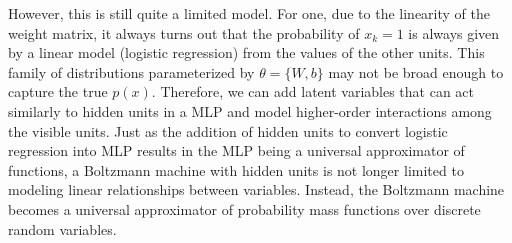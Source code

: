 \documentclass{article}
\begin{document}
  However, this is still quite a limited model. For one, due to the linearity of the weight matrix, it always turns out that the probability of $x_k = 1$ is always given by a linear model (logistic regression) from the values of the other units. This family of distributions parameterized by $\theta = \{W, b\}$ may not be broad enough to capture the true $p(x)$. Therefore, we can add latent variables that can act similarly to hidden units in a MLP and model higher-order interactions among the visible units. Just as the addition of hidden units to convert logistic regression into MLP results in the MLP being a universal approximator of functions, a Boltzmann machine with hidden units is not longer limited to modeling linear relationships between variables. Instead, the Boltzmann machine becomes a universal approximator of probability mass functions over discrete random variables. 
\end{document}
